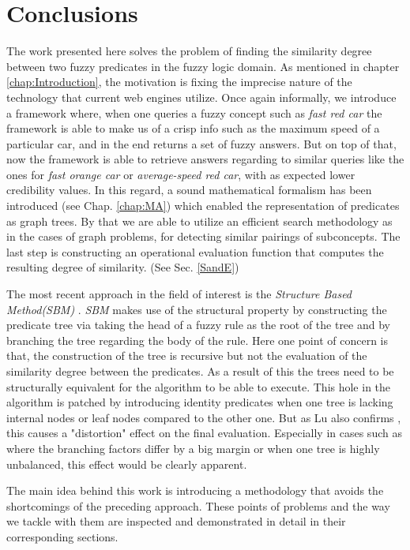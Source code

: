 \documentclass[egilmezThesis.tex]{subfiles}
\begin{document}
\chapter{Conclusions}
\label{chap:conc}

The work presented here solves the problem of finding the similarity degree between two fuzzy predicates in the fuzzy logic domain. As mentioned in chapter \ref{chap:Introduction}, the motivation is fixing the imprecise nature of the technology that current web engines utilize. Once again informally, we introduce a framework where, when one queries a fuzzy concept such as \textit{fast red car} the framework is able to make us of a crisp info such as the maximum speed of a particular car, and in the end returns a set of fuzzy answers. But on top of that, now the framework is able to retrieve answers regarding to similar queries like the ones for \textit{fast orange car} or \textit{average-speed red car}, with as expected lower credibility values. In this regard, a sound mathematical formalism has been introduced (see Chap. \ref{chap:MA}) which enabled the representation of predicates as graph trees. By that we are able to utilize an efficient search methodology as in the cases of graph problems, for detecting similar pairings of subconcepts. The last step is constructing an operational evaluation function that computes the resulting degree of similarity. (See Sec. \ref{SandE})

The most recent approach in the field of interest is the \textit{Structure Based Method(SBM)} \cite{Lu}. \textit{SBM} makes use of the structural property by constructing the predicate tree via taking the head of a fuzzy rule as the root of the tree and by branching the tree regarding the body of the rule. Here one point of concern is that, the construction of the tree is recursive but not the evaluation of the similarity degree between the predicates. As a result of this the trees need to be structurally equivalent for the algorithm to be able to execute.  This hole in the algorithm is patched by introducing identity predicates when one tree is lacking internal nodes or leaf nodes compared to the other one. But as Lu also confirms \cite{Lu}, this causes a "distortion" effect on the final evaluation. Especially in cases such as where the branching factors  differ by a big margin or when one tree is highly unbalanced, this effect would be clearly apparent. 

The main idea behind this work is introducing a methodology that avoids the shortcomings of the preceding approach. These points of problems and the way we tackle with them are inspected and demonstrated in detail in their corresponding sections.
\end{document}
